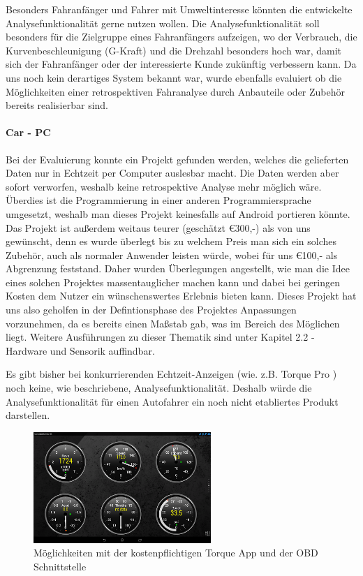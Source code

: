 Besonders Fahranfänger und Fahrer mit Umweltinteresse könnten die entwickelte Analysefunktionalität gerne nutzen wollen. Die Analysefunktionalität soll besonders für die Zielgruppe eines Fahranfängers aufzeigen, wo der Verbrauch, die Kurvenbeschleunigung (G-Kraft) und die Drehzahl besonders hoch war, damit sich der Fahranfänger oder der interessierte Kunde zukünftig verbessern kann. Da uns noch kein derartiges System bekannt war, wurde ebenfalls evaluiert ob die Möglichkeiten einer retrospektiven Fahranalyse durch Anbauteile oder Zubehör bereits realisierbar sind.

\paragraph{Car - PC}
Bei der Evaluierung konnte ein Projekt gefunden werden, welches die gelieferten Daten nur in Echtzeit per Computer auslesbar macht. Die Daten werden aber sofort verworfen, weshalb keine retrospektive Analyse mehr möglich wäre. Überdies ist die Programmierung in einer anderen Programmiersprache umgesetzt, weshalb man dieses Projekt keinesfalls auf Android portieren könnte. Das Projekt ist außerdem weitaus teurer (geschätzt €300,-) als von uns gewünscht, denn es wurde überlegt bis zu welchem Preis man sich ein solches Zubehör, auch als normaler Anwender leisten würde, wobei für uns €100,- als Abgrenzung feststand. Daher wurden Überlegungen angestellt, wie man die Idee eines solchen Projektes massentauglicher machen kann und dabei bei geringen Kosten dem Nutzer ein wünschenswertes Erlebnis bieten kann. \cite{SIMR.CH1-Fahrstil-Analyse.LowBudgetCarPC} Dieses Projekt hat uns also geholfen in der Defintionsphase des Projektes Anpassungen vorzunehmen, da es bereits einen Maßstab gab, was im Bereich des Möglichen liegt. Weitere Ausführungen zu dieser Thematik sind unter Kapitel 2.2 - Hardware und Sensorik auffindbar.

Es gibt bisher bei konkurrierenden Echtzeit-Anzeigen (wie. z.B. Torque Pro \cite{SIMR.CH1-Fahrstil-Analyse.TorquePro}) noch keine, wie beschriebene, Analysefunktionalität. Deshalb würde die Analysefunktionalität für einen Autofahrer ein noch nicht etabliertes Produkt darstellen.

\begin{figure}[!htb]\centering
	\includegraphics[width=0.6\textwidth]{images/torquePro}
	\caption{Möglichkeiten mit der kostenpflichtigen Torque App  und der OBD Schnittstelle \cite{SIMR.CH1-Fahrstil-Analyse.TorquePro}}\label{Fig:imgGTR}
\end{figure}

